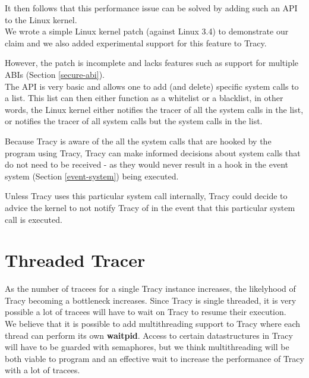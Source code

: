 \documentclass[a4paper, 10pt]{report}
\begin{document}
It then follows that this performance issue can be solved by adding such
an API to the Linux kernel. \\

We wrote a simple Linux kernel patch (against Linux 3.4) to demonstrate
our claim and we also added experimental support for this feature to Tracy.

However, the patch is incomplete and lacks features such as support for
multiple ABIs (Section \ref{secure-abi}). \\

The API is very basic and allows one to add (and delete) specific system
calls to a list. This list can then either function as a whitelist or a
blacklist, in other words, the Linux kernel either notifies the tracer of
all the system calls in the list, or notifies the tracer of all system calls
but the system calls in the list.


Because Tracy is aware of the all the system calls that are hooked by the
program using Tracy, Tracy can make informed decisions about system calls
that do not need to be received - as they would never result in a hook in
the event system (Section \ref{event-system}) being executed.

Unless Tracy uses this particular system call internally, Tracy could decide
to advice the kernel to not notify Tracy of in the event that this particular
system call is executed.


\section{Threaded Tracer}

As the number of tracees for a single Tracy instance increases, the
likelyhood of Tracy becoming a bottleneck increases. Since Tracy is
single threaded, it is very possible a lot of tracees will have to wait
on Tracy to resume their execution. \\

We believe that it is possible to add multithreading support to Tracy where
each thread can perform its own \textbf{waitpid}. Access to certain
datastructures in Tracy will have to be guarded with semaphores, but
we think multithreading will be both viable to program and an effective
wait to increase the performance of Tracy with a lot of tracees.

\end{document}
